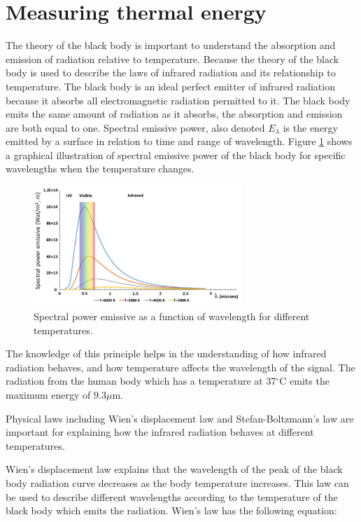 \section{Measuring thermal energy}

The theory of the black body is important to understand the absorption and emission of radiation relative to temperature. Because the theory of the black body is used to describe the laws of infrared radiation and its relationship to temperature. The black body is an ideal perfect emitter of infrared radiation because it absorbs all electromagnetic radiation permitted to it. The black body emits the same amount of radiation as it absorbs, the absorption and emission are both equal to one. 
Spectral emissive power, also denoted $E_\lambda$ is the energy emitted by a surface in relation to time and range of wavelength. Figure \ref{fig:Spectral} shows a graphical illustration of spectral emissive power of the black body for specific wavelengths when the temperature changes.\cite{ignacio2017} 

\begin{figure}[H]
	\centering	\includegraphics[width=0.7\textwidth]{figures/Spectral_power_emissive}
	\caption{Spectral power emissive as a function of wavelength for different temperatures.\cite{ignacio2017}}
	\label{fig:Spectral}
\end{figure} \vspace{-.3cm}

The knowledge of this principle helps in the understanding of how infrared radiation behaves, and how temperature affects the wavelength of the signal. 
The radiation from the human body which has a temperature at 37$^{\circ}$C emits the maximum energy of $9.3 \mu$m.\cite{ignacio2017}

Physical laws including Wien's displacement law and Stefan-Boltzmann's law are important for explaining how the infrared radiation behaves at different temperatures.\cite{ignacio2017} 

Wien's displacement law explains that the wavelength of the peak of the black body radiation curve decreases as the body temperature increases. This law can be used to describe different wavelengths according to the temperature of the black body which emits the radiation. Wien's law has the following equation:\cite{ignacio2017} 

